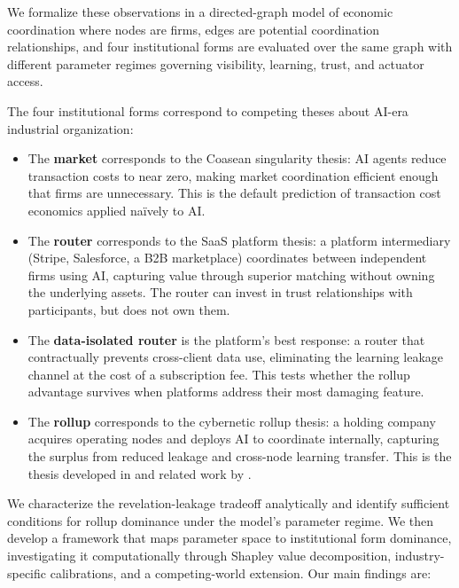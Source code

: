 \documentclass[12pt]{article}
\theoremstyle{definition}
\begin{document}
We formalize these observations in a directed-graph model of economic coordination where nodes are firms, edges are potential coordination relationships, and four institutional forms are evaluated over the same graph with different parameter regimes governing visibility, learning, trust, and actuator access.

The four institutional forms correspond to competing theses about AI-era industrial organization:

\begin{itemize}[leftmargin=*]
\item The \textbf{market} corresponds to the Coasean singularity thesis: AI agents reduce transaction costs to near zero, making market coordination efficient enough that firms are unnecessary. This is the default prediction of transaction cost economics applied na\"ively to AI.

\item The \textbf{router} corresponds to the SaaS platform thesis: a platform intermediary (Stripe, Salesforce, a B2B marketplace) coordinates between independent firms using AI, capturing value through superior matching without owning the underlying assets. The router can invest in trust relationships with participants, but does not own them.

\item The \textbf{data-isolated router} is the platform's best response: a router that contractually prevents cross-client data use, eliminating the learning leakage channel at the cost of a subscription fee. This tests whether the rollup advantage survives when platforms address their most damaging feature.

\item The \textbf{rollup} corresponds to the cybernetic rollup thesis: a holding company acquires operating nodes and deploys AI to coordinate internally, capturing the surplus from reduced leakage and cross-node learning transfer. This is the thesis developed in \citet{larson2025cybernetic} and related work by \citet{hobart2024routers}.
\end{itemize}

We characterize the revelation-leakage tradeoff analytically and identify sufficient conditions for rollup dominance under the model's parameter regime. We then develop a framework that maps parameter space to institutional form dominance, investigating it computationally through Shapley value decomposition, industry-specific calibrations, and a competing-world extension. Our main findings are:
\end{document}
